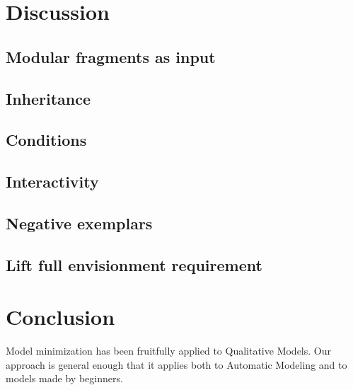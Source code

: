 \documentclass{article}
\begin{document}
\section{Discussion}

\subsection{Modular fragments as input}


\subsection{Inheritance}

\subsection{Conditions}

\subsection{Interactivity}

\subsection{Negative exemplars}

\subsection{Lift full envisionment requirement}


\section{Conclusion}

Model minimization has been fruitfully applied to Qualitative Models. Our
approach is general enough that it applies both to Automatic Modeling and to
models made by beginners.
\end{document}
